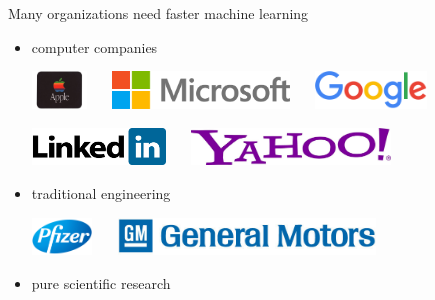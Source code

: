 
\begin{frame}{Many organizations need faster machine learning}

\begin{itemize}
\item 
computer companies

\vspace{0.05in}
\includegraphics[height=1cm]{img-presentation/apple}~~~
\includegraphics[height=1cm]{img-presentation/ms}~~~
\includegraphics[height=1cm]{img-presentation/google}

\vspace{0.05in}
\includegraphics[height=1cm]{img-presentation/linkedin}~~~
\includegraphics[height=1cm]{img-presentation/yahoo}

\pause
\vspace{0.1in}
\item
traditional engineering

\vspace{0.05in}
\includegraphics[height=1cm]{img-presentation/pfizer}~~~
\includegraphics[height=1cm]{img-presentation/gm}

\pause
\vspace{0.1in}
\item 
pure scientific research


\end{itemize}
\end{frame}
